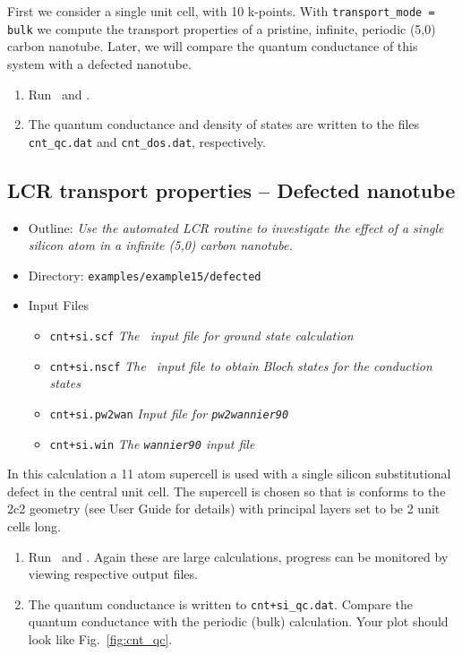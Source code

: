 \documentclass[a4paper,11pt,twoside]{article}
\begin{document}
First we consider a single unit cell, with 10 k-points. With 
{\tt transport\_mode = bulk} we compute the transport properties 
of a pristine, infinite, periodic (5,0) carbon nanotube. Later, we will 
compare the quantum conductance of this system with a defected
nanotube.

\begin{enumerate}
\item Run \pwscf\ and \wannier.\\ 
\item The quantum conductance and density of states are written to the
files {\tt cnt\_qc.dat} and {\tt cnt\_dos.dat}, respectively.
\end{enumerate}

\subsection*{LCR transport properties -- Defected nanotube}

\begin{itemize}
  \item{Outline: \it{Use the automated LCR routine to investigate the effect of
  a single silicon atom in a infinite (5,0) carbon nanotube.}}
  \item{Directory: {\tt examples/example15/defected}}
  \item{Input Files}
    \begin{itemize}
      \item{ {\tt cnt+si.scf}  {\it The \pwscf\ input file for ground state
	  calculation}}
      \item{ {\tt cnt+si.nscf}  {\it The \pwscf\ input file to obtain Bloch
	  states for the conduction states}} 
      \item{ {\tt cnt+si.pw2wan}  {\it Input file for {\tt pw2wannier90}}}
      \item{ {\tt cnt+si.win}  {\it The {\tt wannier90} input file}}
    \end{itemize}
\end{itemize}

In this calculation a 11 atom supercell is used with a single silicon 
substitutional defect in the central unit cell. The supercell is chosen so that is 
conforms to the 2c2 geometry (see User Guide for details) with principal 
layers set to be 2 unit cells long.

\begin{enumerate}
\item Run \pwscf\ and \wannier. Again these are large calculations, progress
can be monitored by viewing respective output files.\\
\item The quantum conductance is written to {\tt cnt+si\_qc.dat}. 
Compare the quantum conductance with the periodic (bulk) calculation.
Your plot should look like Fig.~\ref{fig:cnt_qc}.

\end{enumerate}
\end{document}
